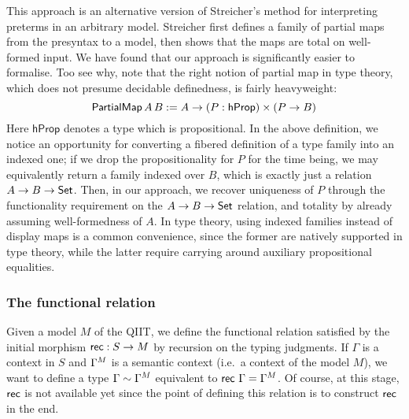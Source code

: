 This approach is an alternative version of Streicher's method for interpreting
preterms in an arbitrary model\cite{streichersemantics}. Streicher first defines
a family of partial maps from the presyntax to a model, then shows that the maps
are total on well-formed input. We have found that our approach is significantly
easier to formalise. Too see why, note that the right notion of partial map in
type theory, which does not presume decidable definedness, is fairly
heavyweight:
\[
  \mathsf{PartialMap}\,A\,B := A\rightarrow (P : \mathsf{hProp})\times(P \rightarrow B)
\]
Here $\mathsf{hProp}$ denotes a type which is propositional. In the above
definition, we notice an opportunity for converting a fibered definition of a
type family into an indexed one; if we drop the propositionality for $P$ for the
time being, we may equivalently return a family indexed over $B$, which is
exactly just a relation $A\rightarrow B\rightarrow\mathsf{Set}$. Then, in our approach, we recover
uniqueness of $P$ through the functionality requirement on the $A\rightarrow B\rightarrow\mathsf{Set}$
relation, and totality by already assuming well-formedness of $A$. In type
theory, using indexed families instead of display maps is a common convenience,
since the former are natively supported in type theory, while the latter require
carrying around auxiliary propositional equalities.

\subsubsection{The functional relation}

Given a model $M$ of the QIIT, we define the functional relation satisfied by
the initial morphism $\mathsf{rec} : S\to M$ by recursion on the typing judgments.
If $\Gamma$ is a context in $S$ and ${\Gamma}^M$ is a semantic context
(i.e.\ a context of the model $M$), we want to define a type
$\Gamma\sim {\Gamma}^M$ equivalent to $\mathsf{rec}\,\,\Gamma={\Gamma}^M$. Of
course, at this stage, $\mathsf{rec}$ is not available yet since the point of
defining this relation is to construct $\mathsf{rec}$ in the end.

